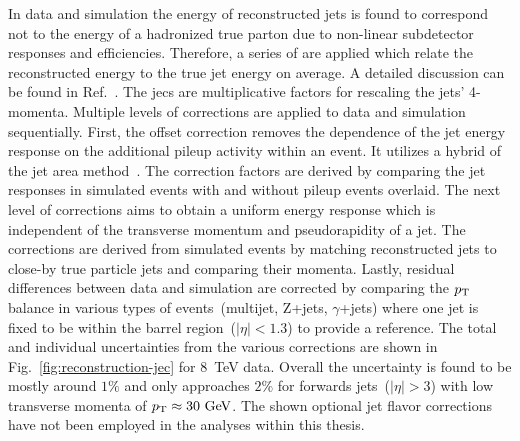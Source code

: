 In data and simulation the energy of reconstructed jets is found to correspond not to the energy of a hadronized true parton due to non-linear subdetector responses and efficiencies. Therefore, a series of  are applied which relate the reconstructed energy to the true jet energy on average. A detailed discussion can be found in Ref.~\cite{Khachatryan:2016kdb}. The \glspl{jec} are multiplicative factors for rescaling the jets' 4-momenta. Multiple levels of corrections are applied to data and simulation sequentially. First, the offset correction removes the dependence of the jet energy response on the additional pileup activity within an event. It utilizes a hybrid of the jet area method~\cite{Cacciari:2007fd}. The correction factors are derived by comparing the jet responses in simulated events with and without pileup events overlaid. The next level of corrections aims to obtain a uniform energy response which is independent of the transverse momentum and pseudorapidity of a jet. The corrections are derived from simulated events by matching reconstructed jets to close-by true particle jets and comparing their momenta. Lastly, residual differences between data and simulation are corrected by comparing the $p_\textrm{T}$ balance in various  types of events~(multijet, \mbox{$\mathrm{Z}$+jets}, \mbox{$\gamma$+jets}) where one jet is fixed to be within the barrel region~($|\eta|<1.3$) to provide a reference. The total and individual uncertainties from the various corrections are shown in Fig.~\ref{fig:reconstruction-jec} for 8~TeV data. Overall the uncertainty is found to be mostly around $1\%$ and only approaches $2\%$ for forwards jets~($|\eta|>3$) with low transverse momenta of $p_\textrm{T}\approx30~\textrm{GeV}$. The shown optional jet flavor corrections have not been employed in the analyses within this thesis.

